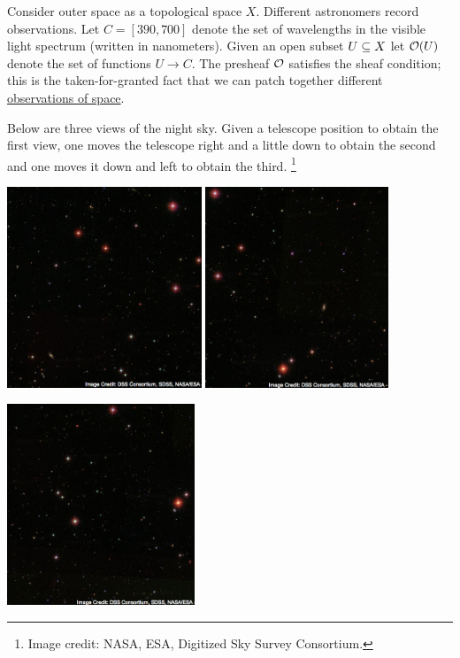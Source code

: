 \documentclass[CT4S-EN-RU]{subfiles}
\begin{document}
\begin{applicationENG}
Consider outer space as a topological space $X.$ Different astronomers record observations. Let $C=[390,700]$ denote the set of wavelengths in the visible light spectrum (written in nanometers). Given an open subset $U\ss X$ let $\mcO(U)$ denote the set of functions $U\to C.$ The presheaf $\mcO$ satisfies the sheaf condition; this is the taken-for-granted fact that we can patch together different \href{http://en.wikipedia.org/wiki/Astrophotography}{\text observations of space}.

Below are three views of the night sky. Given a telescope position to obtain the first view, one moves the telescope right and a little down to obtain the second and one moves it down and left to obtain the third.
\footnote{Image credit: NASA, ESA, Digitized Sky Survey Consortium.}
\begin{center}\parbox{5.5in}{\begin{center}
\includegraphics[height=6cm]{Sky1}\hsp
\includegraphics[height=6cm]{Sky2}\end{center}
\hspace{1.8in}
\includegraphics[height=6cm]{Sky3}}\end{center}

\end{applicationENG}
\end{document}

